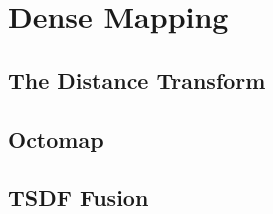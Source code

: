 \section{Dense Mapping}

\subsection{The Distance Transform}

\subsection{Octomap}

\subsection{TSDF Fusion}


